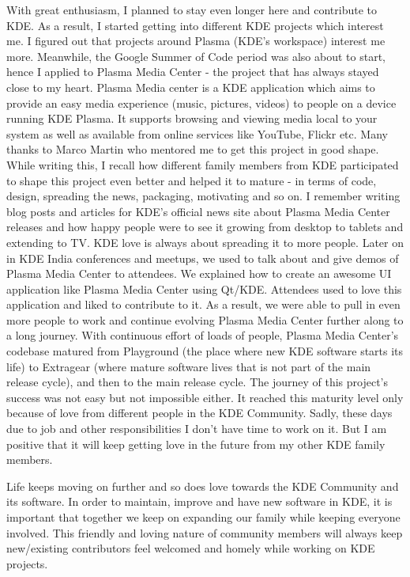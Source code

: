 With great enthusiasm, I planned to stay even longer here and contribute to KDE. As a result, I started getting into different KDE projects which interest me. I figured out that projects around Plasma (KDE’s workspace) interest me more. Meanwhile, the Google Summer of Code period was also about to start, hence I applied to Plasma Media Center - the project that has always stayed close to my heart. Plasma Media center is a KDE application which aims to provide an easy media experience (music, pictures, videos) to people on a device running KDE Plasma. It supports browsing and viewing media local to your system as well as available from online services like YouTube, Flickr etc. Many thanks to Marco Martin who mentored me to get this project in good shape. While writing this, I recall how different family members from KDE participated to shape this project even better and helped it to mature - in terms of code, design, spreading the news, packaging, motivating and so on. I remember writing blog posts and articles for KDE's official news site about Plasma Media Center releases and how happy people were to see it growing from desktop to tablets and extending to TV. KDE love is always about spreading it to more people. Later on in KDE India conferences and meetups, we used to talk about and give demos of Plasma Media Center to attendees. We explained how to create an awesome UI application like Plasma Media Center using Qt/KDE. Attendees used to love this application and liked to contribute to it. As a result, we were able to pull in even more people to work and continue evolving Plasma Media Center further along to a long journey. With continuous effort of loads of people, Plasma Media Center's codebase matured from Playground (the place where new KDE software starts its life) to Extragear (where mature software lives that is not part of the main release cycle), and then to the main release cycle. The journey of this project's success was not easy but not impossible either. It reached this maturity level only because of love from different people in the KDE Community. Sadly, these days due to job and other responsibilities I don't have time to work on it. But I am positive that it will keep getting love in the future from my other KDE family members.

Life keeps moving on further and so does love towards the KDE Community and its software. In order to maintain, improve and have new software in KDE, it is important that together we keep on expanding our family while keeping everyone involved. This friendly and loving nature of community members will always keep new/existing contributors feel welcomed and homely while working on KDE projects.
